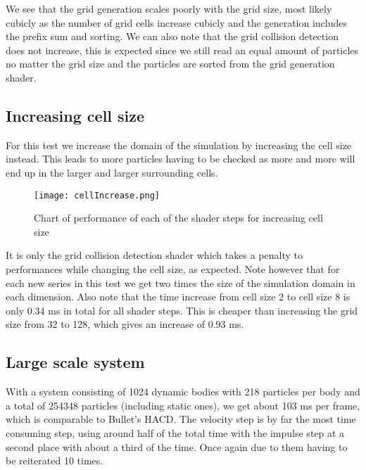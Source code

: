 We see that the grid generation scales poorly with the grid size, most likely cubicly
as the number of grid cells increase cubicly and the generation includes the prefix sum and sorting.
We can also note that the grid collision detection does not increase, this is expected since
we still read an equal amount of particles no matter the grid size and the particles are
sorted from the grid generation shader.

\subsection{Increasing cell size}
For this test we increase the domain of the simulation by increasing the cell size instead.
This leads to more particles having to be checked as more and more will end up in
the larger and larger surrounding cells.
\begin{figure}[H]
  \centering
  \texttt{[image: cellIncrease.png]}
  \caption{Chart of performance of each of the shader steps for increasing cell size}
\end{figure}

It is only the grid collision detection shader which takes a penalty to performances
while changing the cell size, as expected. Note however that for each new series
in this test we get two times the size of the simulation domain in each dimension.
Also note that the time increase from cell size 2 to cell size 8 is only 0.34 ms in total for all shader steps.
This is cheaper than increasing the grid size from 32 to 128, which gives an increase of 0.93 ms.

\subsection{Large scale system}
With a system consisting of 1024 dynamic bodies with 218 particles per body
 and a total of 254348 particles (including
static ones), we get about 103 ms per frame, which is comparable to Bullet's HACD.
The velocity step is by far the most time consuming step, using around half of the total time with
the impulse step at a second place with about a third of the time. Once again due
to them having to be reiterated 10 times.

